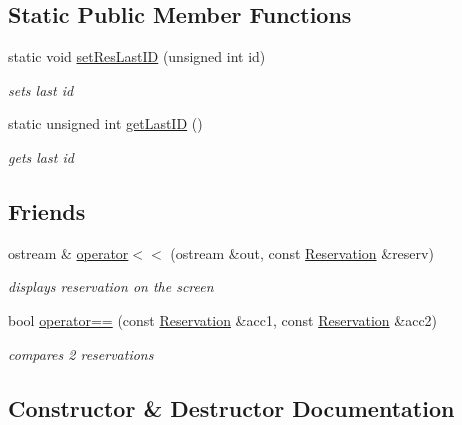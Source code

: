 \subsection*{Static Public Member Functions}
\begin{DoxyCompactItemize}
\item 
static void \hyperlink{class_reservation_ad4f0df816beef2705e8b1ac555ce6243}{set\+Res\+Last\+ID} (unsigned int id)
\begin{DoxyCompactList}\small\item\em sets last id \end{DoxyCompactList}\item 
static unsigned int \hyperlink{class_reservation_ae4d593787bc501a8e4a47ba6b232ff1f}{get\+Last\+ID} ()
\begin{DoxyCompactList}\small\item\em gets last id \end{DoxyCompactList}\end{DoxyCompactItemize}
\subsection*{Friends}
\begin{DoxyCompactItemize}
\item 
ostream \& \hyperlink{class_reservation_ad08627b6936df4b1b1a5c0351355ffbe}{operator$<$$<$} (ostream \&out, const \hyperlink{class_reservation}{Reservation} \&reserv)
\begin{DoxyCompactList}\small\item\em displays reservation on the screen \end{DoxyCompactList}\item 
bool \hyperlink{class_reservation_aedba0fd671214e780c8933b23585b0c9}{operator==} (const \hyperlink{class_reservation}{Reservation} \&acc1, const \hyperlink{class_reservation}{Reservation} \&acc2)
\begin{DoxyCompactList}\small\item\em compares 2 reservations \end{DoxyCompactList}\end{DoxyCompactItemize}


\subsection{Constructor \& Destructor Documentation}
\hypertarget{class_reservation_a467a8d7c95875dedefa0a165ba2d11bd}{}\label{class_reservation_a467a8d7c95875dedefa0a165ba2d11bd} 
